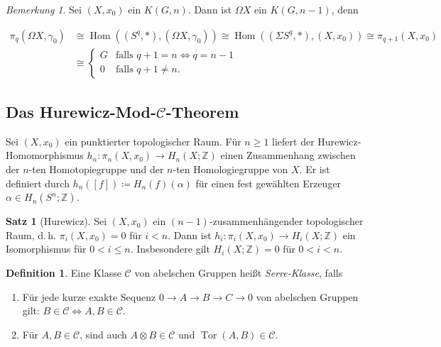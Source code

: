 \documentclass[11pt, a4paper, german]{article}
\theoremstyle{definition}
\newtheorem*{satz}{Satz}
\newtheorem*{defn}{Definition}
\theoremstyle{remark}
\newtheorem*{bem}{Bemerkung}
\newcommand{\Z}{\mathbb{Z}} %
\DeclareMathOperator{\Hom}{Hom} %
\DeclareMathOperator{\Tor}{Tor} %
\newcommand{\SC}{\mathcal{C}} %
\renewcommand{\dh}{d.\,h.} %
\begin{document}

\begin{bem}
  Sei $(X, x_0)$ ein $K(G, n)$. Dann ist $\Omega X$ ein $K(G, n-1)$, denn

  \begin{align*}
    \pi_q(\Omega X, \gamma_0) & \cong \Hom((S^q, *), (\Omega X, \gamma_0))
    \cong \Hom((\Sigma S^q, *), (X, x_0))
    \cong \pi_{q+1}(X, x_0) \\
    & \cong \begin{cases}
      G & \text{falls $q+1 = n \iff q = n-1$} \\
      0 & \text{falls $q+1 \neq n$.}
    \end{cases}
  \end{align*}
\end{bem}

\subsection{Das Hurewicz-Mod-$\SC$-Theorem}

Sei $(X, x_0)$ ein punktierter topologischer Raum.
Für $n \geq 1$ liefert der Hurewicz-Homomorphismus $h_n : \pi_n(X, x_0) \to H_n(X; \Z)$ einen Zusammenhang zwischen der $n$-ten Homotopiegruppe und der $n$-ten Homologiegruppe von $X$.
Er ist definiert durch $h_n([f]) \coloneqq H_n(f)(\alpha)$ für einen fest gewählten Erzeuger $\alpha \in H_n(S^n; \Z)$.

\begin{satz}[Hurewicz]
  Sei $(X, x_0)$ ein $(n{-}1)$-zusammenhängender topologischer Raum, \dh{} $\pi_i(X, x_0) = 0$ für $i < n$.
  Dann ist $h_i : \pi_i(X, x_0) \to H_i(X; \Z)$ ein Isomorphismus für $0 < i \leq n$.
  Insbesondere gilt $H_i(X; \Z) = 0$ für $0 < i < n$.
\end{satz}


\begin{defn}
  Eine Klasse $\SC$ von abelschen Gruppen heißt \emph{Serre-Klasse}, falls
  \begin{enumerate}
    \item Für jede kurze exakte Sequenz $0 \to A \to B \to C \to 0$ von abelschen Gruppen gilt: $B \in \SC \iff A, B \in \SC$.
    \item Für $A, B \in \SC$, sind auch $A \otimes B \in \SC$ und $\Tor(A, B) \in \SC$.
  \end{enumerate}
\end{defn}
\end{document}
